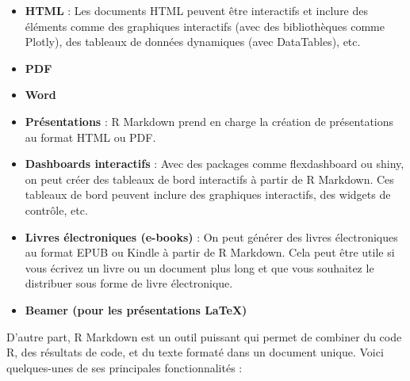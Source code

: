 \documentclass[
  12pt,
]{article}
\begin{document}
\begin{itemize}
\item
  \textbf{HTML} : Les documents HTML peuvent être interactifs et inclure
  des éléments comme des graphiques interactifs (avec des bibliothèques
  comme Plotly), des tableaux de données dynamiques (avec DataTables),
  etc.
\item
  \textbf{PDF}
\item
  \textbf{Word}
\item
  \textbf{Présentations} : R Markdown prend en charge la création de
  présentations au format HTML ou PDF.
\item
  \textbf{Dashboards interactifs} : Avec des packages comme
  flexdashboard ou shiny, on peut créer des tableaux de bord interactifs
  à partir de R Markdown. Ces tableaux de bord peuvent inclure des
  graphiques interactifs, des widgets de contrôle, etc.
\item
  \textbf{Livres électroniques (e-books)} : On peut générer des livres
  électroniques au format EPUB ou Kindle à partir de R Markdown. Cela
  peut être utile si vous écrivez un livre ou un document plus long et
  que vous souhaitez le distribuer sous forme de livre électronique.
\item
  \textbf{Beamer (pour les présentations LaTeX)}
\end{itemize}

D'autre part, R Markdown est un outil puissant qui permet de combiner du
code R, des résultats de code, et du texte formaté dans un document
unique. Voici quelques-unes de ses principales fonctionnalités :
\end{document}
